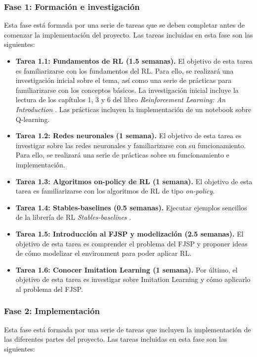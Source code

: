 \subsubsection{Fase 1: Formación e investigación}
Esta fase está formada por una serie de tareas que se deben completar antes de
comenzar la implementación del proyecto. Las tareas incluidas en esta fase son
las siguientes:

\begin{itemize}
    \item \textbf{Tarea 1.1: Fundamentos de RL (1.5 semanas).} El objetivo de esta tarea es
          familiarizarse con los fundamentos del RL\@. Para ello, se realizará una investigación
          inicial sobre el tema, así como una serie de prácticas para familiarizarse con los
          conceptos básicos. La investigación inicial incluye la lectura de los capítulos 1, 3 y 6
          del libro \textit{Reinforcement Learning: An Introduction} \cite{sutton2018reinforcement}.
          Las prácticas incluyen la implementación de un notebook sobre Q-learning.
    \item \textbf{Tarea 1.2: Redes neuronales (1 semana).} El objetivo de esta tarea es
          investigar sobre las redes neuronales y familiarizarse con su funcionamiento. Para ello,
          se realizará una serie de prácticas sobre su funcionamiento e implementación.
    \item \textbf{Tarea 1.3: Algoritmos on-policy de RL (1 semana).} El objetivo de esta tarea
          es familiarizarse con los algoritmos de RL de tipo \textit{on-policy}.
    \item \textbf{Tarea 1.4: Stables-baselines (0.5 semanas).} Ejecutar ejemplos sencillos
          de la librería de RL \textit{Stables-baselines} \cite{stable-baselines3}.
    \item \textbf{Tarea 1.5: Introducción al FJSP y modelización (2.5 semanas).} El
          objetivo de esta tarea es comprender el problema del FJSP y proponer ideas de cómo
          modelizar el environment para poder aplicar RL\@.
    \item \textbf{Tarea 1.6: Conocer Imitation Learning (1 semana).} Por último, el objetivo
          de esta tarea es investigar sobre Imitation Learning y cómo aplicarlo al problema del
          FJSP\@.
\end{itemize}

\subsubsection{Fase 2: Implementación}
Esta fase está formada por una serie de tareas que incluyen la implementación
de las diferentes partes del proyecto. Las tareas incluidas en esta fase son
las siguientes:


